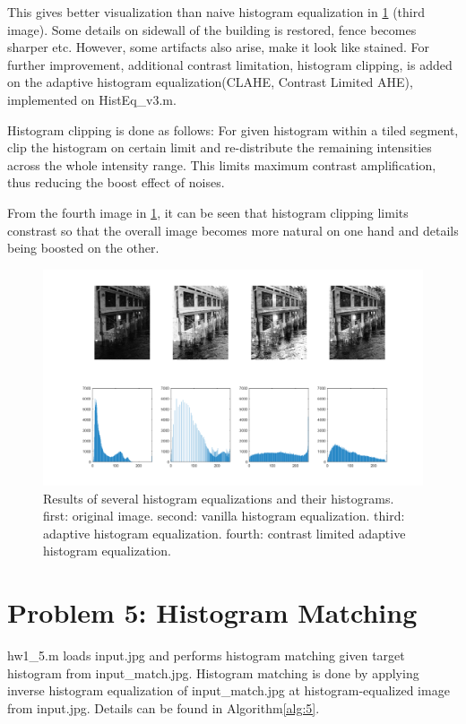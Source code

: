 \documentclass[extendedabs]{bmvc2k}
\begin{document}
This gives better visualization than naive histogram equalization in 
\figurename{\ref{fig:6}} (third image). Some details on sidewall of the building is restored,
fence becomes sharper etc. However, some artifacts also arise, make it look like stained.
For further improvement, additional contrast limitation, histogram clipping, is added on the adaptive
histogram equalization(CLAHE, Contrast Limited AHE), implemented on HistEq\_v3.m.

Histogram clipping is done as follows: For given histogram within a tiled
segment, clip the histogram on certain limit and re-distribute the remaining
intensities across the whole intensity range. This limits maximum contrast
amplification, thus reducing the boost effect of noises.

From the fourth image in \figurename{\ref{fig:6}}, it can be seen that 
histogram clipping limits constrast so that the overall image becomes more
natural on one hand and details being boosted on the other.

\begin{figure}[t]
    \centering
    \includegraphics[width=\linewidth]{hw1_4}
    \caption{Results of several histogram equalizations and their histograms. 
    first: original image. second: vanilla histogram equalization.
    third: adaptive histogram equalization.
    fourth: contrast limited adaptive histogram equalization.}
    \label{fig:6}
    \vspace{-2mm}
\end{figure}

\section*{Problem 5: Histogram Matching}

hw1\_5.m loads input.jpg and performs histogram matching given
target histogram from input\_match.jpg. Histogram matching is done by
applying inverse histogram equalization of input\_match.jpg at histogram-equalized
image from input.jpg. Details can be found in Algorithm\ref{alg:5}.
\end{document}
